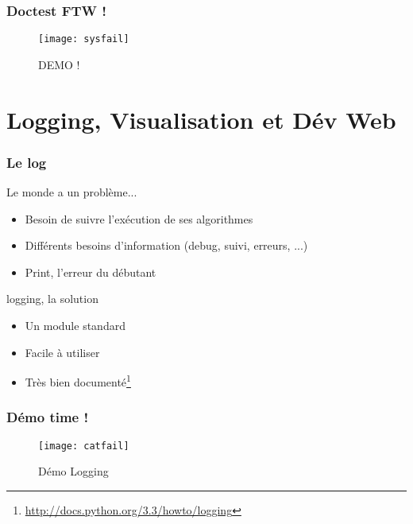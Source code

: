 \documentclass{beamer}
\begin{document}
\begin{frame}
  \frametitle{Doctest FTW !}

  \begin{figure}[!h]
    \centering
    \texttt{[image: sysfail]}
    \caption{DEMO !}
    \label{fig:doctestdemo}
  \end{figure}
\end{frame}


\section{Logging, Visualisation et Dév Web}
\label{sec:libraries}

\begin{frame}
  \frametitle{Le log}

  \begin{block}{Le monde a un problème...}
    \begin{itemize}
    \item Besoin de suivre l'exécution de ses algorithmes
    \item Différents besoins d'information (debug, suivi, erreurs,
      ...)
    \item Print, l'erreur du débutant
    \end{itemize}
  \end{block}

  \pause

  \begin{block}{logging, la solution}
    \begin{itemize}
    \item Un module standard
    \item Facile à utiliser
    \item Très bien documenté\footnote{\url{http://docs.python.org/3.3/howto/logging}}
    \end{itemize}
  \end{block}
\end{frame}

\begin{frame}
  \frametitle{Démo time !}
  \begin{figure}[!h]
    \centering
    \texttt{[image: catfail]}
    \caption{Démo Logging}
    \label{fig:loggingdemo}
  \end{figure}
\end{frame}
\end{document}
